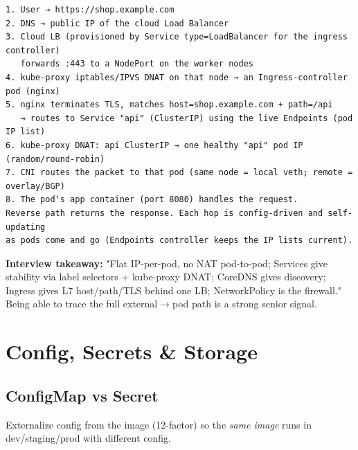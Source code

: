 \documentclass[11pt]{article}
\begin{document}
\setcodelang{}

\begin{verbatim}
1. User → https://shop.example.com
2. DNS → public IP of the cloud Load Balancer
3. Cloud LB (provisioned by Service type=LoadBalancer for the ingress controller)
   forwards :443 to a NodePort on the worker nodes
4. kube-proxy iptables/IPVS DNAT on that node → an Ingress-controller pod (nginx)
5. nginx terminates TLS, matches host=shop.example.com + path=/api
   → routes to Service "api" (ClusterIP) using the live Endpoints (pod IP list)
6. kube-proxy DNAT: api ClusterIP → one healthy "api" pod IP (random/round-robin)
7. CNI routes the packet to that pod (same node = local veth; remote = overlay/BGP)
8. The pod's app container (port 8080) handles the request.
Reverse path returns the response. Each hop is config-driven and self-updating
as pods come and go (Endpoints controller keeps the IP lists current).
\end{verbatim}

\textbf{Interview takeaway:} "Flat IP-per-pod, no NAT pod-to-pod; Services give stability via label selectors + kube-proxy DNAT; CoreDNS gives discovery; Ingress gives L7 host/path/TLS behind one LB; NetworkPolicy is the firewall." Being able to trace the full external\(\rightarrow\)pod path is a strong senior signal.

\section{Config, Secrets \& Storage}\label{config-secrets--storage}

\subsection{ConfigMap vs Secret}\label{configmap-vs-secret}

Externalize config from the image (12-factor) so the \emph{same image} runs in dev/staging/prod with different config.
\end{document}

